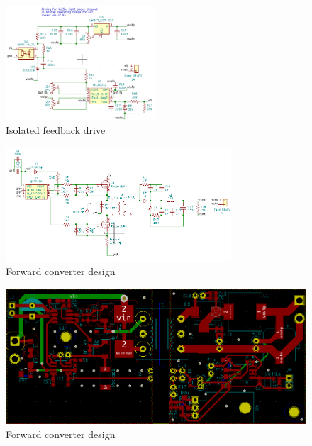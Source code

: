 \documentclass[15pt]{article}
\begin{document}
\begin{figure}[H]
    \centering
    \includegraphics[width=0.5\textwidth]{forwardfeedback}
    \caption{Isolated feedback drive}
    \label{fig:forwardback}
\end{figure}
\begin{figure}[H]
    \centering
    \includegraphics[width=0.75\textwidth]{forwarddrive}
    \caption{Forward converter design}
    \label{fig:forwarddrive}
\end{figure}
\begin{figure}[H]
    \includegraphics[width=\textwidth]{forwardlayout}
    \caption{Forward converter design}
    \label{fig:forwardlay}
\end{figure}

\end{document}

